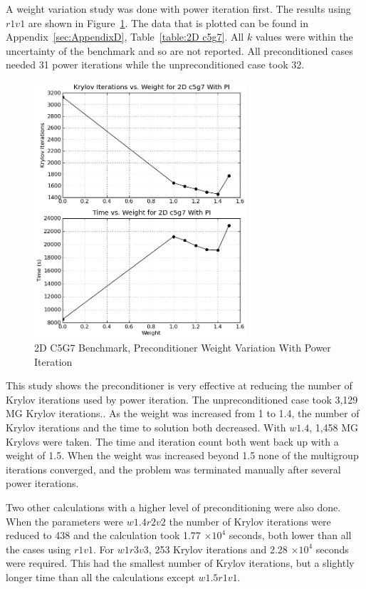 A weight variation study was done with power iteration first. The results using $r1v1$ are shown in Figure~\ref{fig:2Dc5g7PI}. The data that is plotted can be found in Appendix~\ref{sec:AppendixD}, Table~\ref{table:2D c5g7}. All $k$ values were within the uncertainty of the benchmark and so are not reported. All preconditioned cases needed 31 power iterations while the unpreconditioned case took 32.
%
\begin{figure}[!ht]
    \begin{center}
      \includegraphics [width=0.7\textwidth, height=0.7\textheight] {2dc5g7PI}
   \end{center}
   \caption{2D C5G7 Benchmark, Preconditioner Weight Variation With Power Iteration}
   \label{fig:2Dc5g7PI}
\end{figure}

This study shows the preconditioner is very effective at reducing the number of Krylov iterations used by power iteration. The unpreconditioned case took 3,129 MG Krylov iterations.. As the weight was increased from 1 to 1.4, the number of Krylov iterations and the time to solution both decreased. With $w1.4$, 1,458 MG Krylovs were taken. The time and iteration count both went back up with a weight of 1.5. When the weight was increased beyond 1.5 none of the multigroup iterations converged, and the problem was terminated manually after several power iterations. 

Two other calculations with a higher level of preconditioning were also done. When the parameters were $w1.4r2v2$ the number of Krylov iterations were reduced to 438 and the calculation took 1.77 $\times 10^{4}$ seconds, both lower than all the cases using $r1v1$. For $w1r3v3$, 253 Krylov iterations and 2.28 $\times 10^{4}$ seconds were required. This had the smallest number of Krylov iterations, but a slightly longer time than all the calculations except $w1.5r1v1$.	

